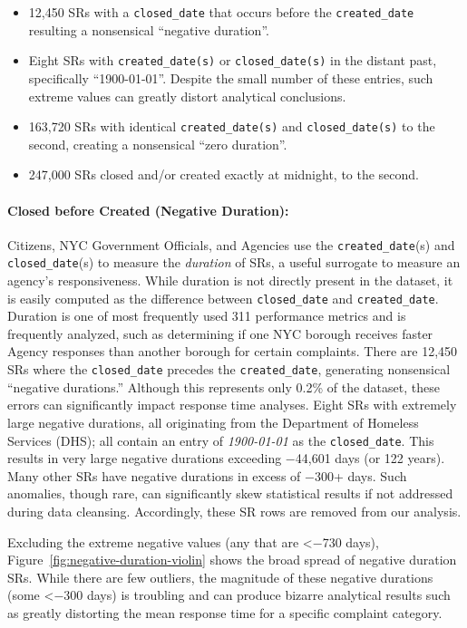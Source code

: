 \documentclass[linenumber]{jdsart}
\begin{document}
\begin{itemize}[left=1.5em]
    \item 12,450 SRs with a \texttt{closed\_date} that occurs before the 
    \texttt{created\_date} resulting a nonsensical ``negative duration''. 
    \item Eight SRs with \texttt{created\_date(s)} or \texttt{closed\_date(s)} in 
    the distant past, specifically ``1900-01-01''. Despite the small number of 
    these entries, such extreme values can greatly distort analytical conclusions.
    \item 163,720 SRs with identical \texttt{created\_date(s)} and \texttt{closed\_date(s)} 
    to the second, creating a nonsensical ``zero duration''. 
    \item 247,000 SRs closed and/or created exactly at midnight, to the second.
\end{itemize}


\paragraph{Closed before Created (Negative Duration):}
Citizens, NYC Government Officials, and Agencies use the \texttt{created\_date}(s) and 
\texttt{closed\_date}(s) to measure the \textit{duration} of SRs, 
a useful surrogate to measure an agency's responsiveness. 
While duration is not directly present in the dataset, 
it is easily computed as the difference between
\texttt{closed\_date} and \texttt{created\_date}.  Duration is one of 
most frequently used 311 performance metrics 
and is frequently analyzed, such as determining if 
one NYC borough receives faster Agency responses than 
another borough for certain complaints. There are 
12,450 SRs where the \texttt{closed\_date} precedes the 
\texttt{created\_date}, generating nonsensical ``negative durations.'' 
Although this represents only 0.2\% of the dataset, these errors can 
significantly impact response time analyses. Eight SRs with extremely 
large negative durations, all originating from the 
Department of Homeless Services (DHS); all contain an entry 
of \textit{1900-01-01} as the \texttt{closed\_date}. This results 
in very large negative durations exceeding $-$44,601 
days (or 122 years). Many other SRs have negative durations 
in excess of $-$300+ days. Such anomalies, though rare, can 
significantly skew statistical results if not addressed during 
data cleansing. Accordingly, these SR rows are removed from our analysis. 

Excluding the extreme negative values (any that are <$-$730 days), 
Figure~\ref{fig:negative-duration-violin} shows the broad spread of 
negative duration SRs. While there are few outliers, the magnitude 
of these negative durations (some <$-$300 days) is troubling 
and can produce bizarre analytical results such as greatly 
distorting the mean response time for a specific complaint category.
\end{document}
